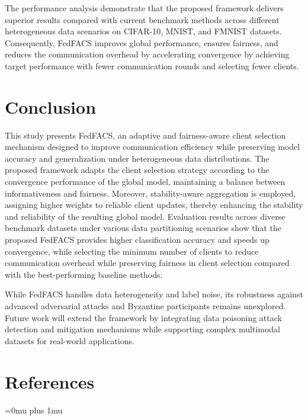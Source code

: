 \documentclass[pdflatex,sn-mathphys-num,oneside]{sn-jnl}%
\theoremstyle{thmstyleone}%
\theoremstyle{thmstyletwo}%
\theoremstyle{thmstylethree}%
\begin{document}
The performance analysis demonstrate that the proposed framework delivers superior results compared with current benchmark methods across different heterogeneous data scenarios on CIFAR-10, MNIST, and FMNIST datasets. Consequently, FedFACS improves global performance, ensures fairness, and reduces the communication overhead by accelerating convergence by achieving target performance with fewer communication rounds and selecting fewer clients.


\FloatBarrier
\section{Conclusion}
\label{sec:conclusion}

This study presents FedFACS, an adaptive and fairness-aware client selection mechanism designed to improve communication efficiency while preserving model accuracy and generalization under heterogeneous data distributions. The proposed framework adapts the client selection strategy according to the convergence performance of the global model, maintaining a balance between informativeness and fairness. Moreover, stability-aware aggregation is employed, assigning higher weights to reliable client updates, thereby enhancing the stability and reliability of the resulting global model. Evaluation results across diverse benchmark datasets under various data partitioning scenarios show that the proposed FedFACS provides higher classification accuracy and speeds up convergence, while selecting the minimum number of clients to reduce communication overhead while preserving fairness in client selection compared with the best-performing baseline methods.

While FedFACS handles data heterogeneity and label noise, its robustness against advanced adversarial attacks and Byzantine participants remains unexplored. Future work will extend the framework by integrating data poisoning attack detection and mitigation mechanisms while supporting complex multimodal datasets for real-world applications.

\FloatBarrier
\backmatter


\section{References}

\begingroup
\small
\setlength{\emergencystretch}{2em}
\setlength{\parindent}{0pt}
\setlength{\parskip}{0pt}
\setlength{\leftskip}{0pt}
\setlength{\rightskip}{0pt}
\Urlmuskip=0mu plus 1mu\relax
\renewcommand{\section}[2]{}
\end{document}
